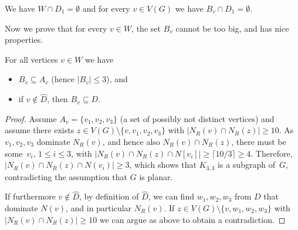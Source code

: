
\begin{lemma}\label{lem:WcapD1}
  We have $W\cap D_1=\emptyset$ and for every $v\in V(G)$ we have
  $B_v\cap D_1=\emptyset$.
\end{lemma}


Now we prove that for every $v\in W$, the set $B_v$ cannot be too big,
and has nice properties.
\begin{lemma}\label{lem:dominating-dominators}
  For all vertices $v\in W$ we have

  \vspace{-5pt}
  \begin{itemize}
  \item $B_v \subseteq A_v$ (hence $|B_v|\le 3$), and \smallskip
  \item if $v\not\in \hat{D}$, then $B_v\subseteq D$.
  \end{itemize}
\end{lemma}

\begin{proof}
  Assume $A_v=\{v_1,v_2,v_3\}$ (a set of possibly not distinct
  vertices) and assume there exists
  $z\in V(G)\setminus \{v,v_1,v_2, v_3\}$ with
  $|N_R(v) \cap N_R(z)| \geq 10$.  As $v_1, v_2, v_3$ dominate $N_R(v)$,
  and hence also \mbox{$N_R(v)\cap N_R(z)$}, there must be some~$v_i$,
  $1\leq i\leq 3$, with
  \mbox{$|N_R(v) \cap N_R(z) \cap N[v_i]| \geq \lceil 10/3\rceil \geq
    4$}.  Therefore, $|N_R(v) \cap N_R(z) \cap N(v_i)| \geq 3$,
  which shows that $K_{3,3}$ is a subgraph of~$G$, contradicting the
  assumption that $G$ is planar.

  If furthermore $v\not\in \hat{D}$, by definition of $\hat{D}$, we
  can find $w_1,w_2, w_3$ from $D$ that dominate $N(v)$, and in
  particular $N_R(v)$.  If $z\in V(G)\setminus \{v,w_1,w_2, w_3\}$
  with $|N_R(v) \cap N_R(z)| \geq 10$ we can argue as above to obtain
  a contradiction.
\end{proof}

%

